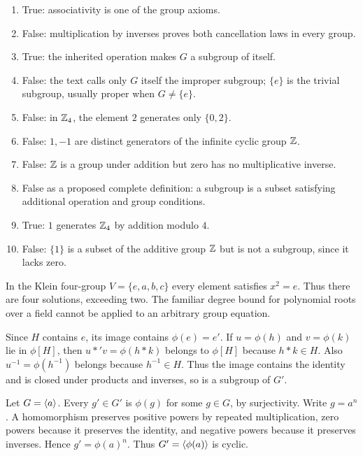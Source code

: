\begin{enumerate}[label=(\alph*)]
\item True: associativity is one of the group axioms.
\item False: multiplication by inverses proves both cancellation laws in every group.
\item True: the inherited operation makes $G$ a subgroup of itself.
\item False: the text calls only $G$ itself the improper subgroup; $\{e\}$ is the trivial subgroup, usually proper when $G\ne\{e\}$.
\item False: in $\mathbb{Z}_4$, the element $2$ generates only $\{0,2\}$.
\item False: $1,-1$ are distinct generators of the infinite cyclic group $\mathbb{Z}$.
\item False: $\mathbb{Z}$ is a group under addition but zero has no multiplicative inverse.
\item False as a proposed complete definition: a subgroup is a subset satisfying additional operation and group conditions.
\item True: $1$ generates $\mathbb{Z}_4$ by addition modulo $4$.
\item False: $\{1\}$ is a subset of the additive group $\mathbb{Z}$ but is not a subgroup, since it lacks zero.
\end{enumerate}


In the Klein four-group $V=\{e,a,b,c\}$ every element satisfies $x^2=e$. Thus there are four solutions, exceeding two. The familiar degree bound for polynomial roots over a field cannot be applied to an arbitrary group equation.


Since $H$ contains $e$, its image contains $\phi(e)=e'$. If $u=\phi(h)$ and $v=\phi(k)$ lie in $\phi[H]$, then $u*'v=\phi(h*k)$ belongs to $\phi[H]$ because $h*k\in H$. Also $u^{-1}=\phi(h^{-1})$ belongs because $h^{-1}\in H$. Thus the image contains the identity and is closed under products and inverses, so is a subgroup of $G'$.


Let $G=\langle a\rangle$. Every $g'\in G'$ is $\phi(g)$ for some $g\in G$, by surjectivity. Write $g=a^n$. A homomorphism preserves positive powers by repeated multiplication, zero powers because it preserves the identity, and negative powers because it preserves inverses. Hence $g'=\phi(a)^n$. Thus $G'=\langle \phi(a)\rangle$ is cyclic.

